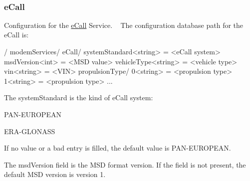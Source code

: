 ~\newline
\hypertarget{config_tree_page_ecallConfigTree}{}\subsubsection{e\+Call}\label{config_tree_page_ecallConfigTree}
Configuration for the \hyperlink{c_ecall}{e\+Call} Service. ~\newline
 The configuration database path for the e\+Call is\+: \begin{DoxyVerb}/
    modemServices/
        eCall/
            systemStandard<string> = <eCall system>
            msdVersion<int> = <MSD value>
            vehicleType<string> = <vehicle type>
            vin<string> = <VIN>
            propulsionType/
                0<string> = <propulsion type>
                1<string> = <propulsion type>
                ...
\end{DoxyVerb}


The \textquotesingle{}system\+Standard\textquotesingle{} is the kind of e\+Call system\+:
\begin{DoxyItemize}
\item P\+A\+N-\/\+E\+U\+R\+O\+P\+E\+A\+N
\item E\+R\+A-\/\+G\+L\+O\+N\+A\+S\+S
\end{DoxyItemize}

If no value or a bad entry is filled, the default value is \textquotesingle{}P\+A\+N-\/\+E\+U\+R\+O\+P\+E\+A\+N\textquotesingle{}.

The \textquotesingle{}msd\+Version\textquotesingle{} field is the M\+S\+D format version. If the field is not present, the default M\+S\+D version is version 1.

